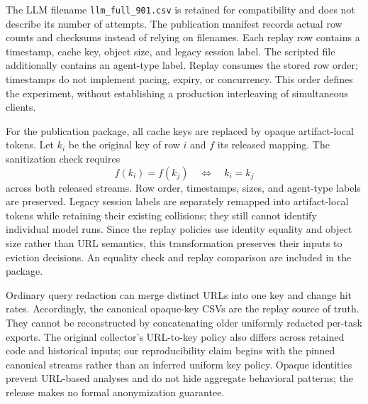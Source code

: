 \documentclass[10pt,sigconf,nonacm]{acmart}
\begin{document}
The LLM filename \texttt{llm\_full\_901.csv} is retained for compatibility and does not describe its number of attempts. The publication manifest records actual row counts and checksums instead of relying on filenames. Each replay row contains a timestamp, cache key, object size, and legacy session label. The scripted file additionally contains an agent-type label. Replay consumes the stored row order; timestamps do not implement pacing, expiry, or concurrency. This order defines the experiment, without establishing a production interleaving of simultaneous clients.

For the publication package, all cache keys are replaced by opaque artifact-local tokens. Let $k_i$ be the original key of row $i$ and $f$ its released mapping. The sanitization check requires
\begin{equation}
f(k_i)=f(k_j) \quad\Longleftrightarrow\quad k_i=k_j
\label{eq:bijection}
\end{equation}
across both released streams. Row order, timestamps, sizes, and agent-type labels are preserved. Legacy session labels are separately remapped into artifact-local tokens while retaining their existing collisions; they still cannot identify individual model runs. Since the replay policies use identity equality and object size rather than URL semantics, this transformation preserves their inputs to eviction decisions. An equality check and replay comparison are included in the package.

Ordinary query redaction can merge distinct URLs into one key and change hit rates. Accordingly, the canonical opaque-key CSVs are the replay source of truth. They cannot be reconstructed by concatenating older uniformly redacted per-task exports. The original collector's URL-to-key policy also differs across retained code and historical inputs; our reproducibility claim begins with the pinned canonical streams rather than an inferred uniform key policy. Opaque identities prevent URL-based analyses and do not hide aggregate behavioral patterns; the release makes no formal anonymization guarantee.
\end{document}
